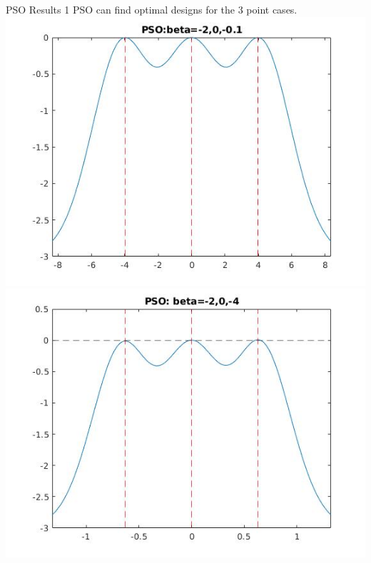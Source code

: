 \documentclass[11pt]{beamer}
\begin{document}
\begin{frame}{PSO Results 1}
PSO can find optimal designs for the 3 point cases.
\includegraphics[scale=0.28]{quadplots/PSO_3.jpg}
\includegraphics[scale=0.28]{quadplots/PSO_4.jpg}
\end{frame}
\end{document}
